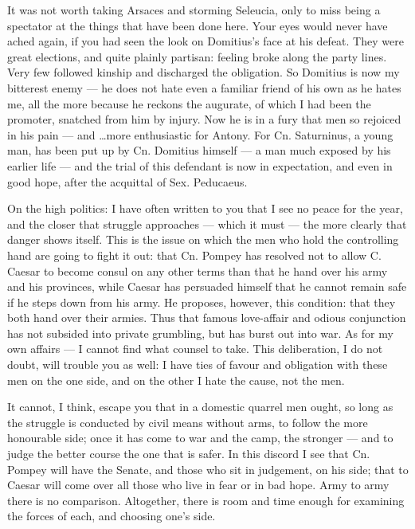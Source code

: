 

 It was not worth taking Arsaces and storming Seleucia, only to miss being a spectator at the things that have been done here. Your eyes would never have ached again, if you had seen the look on Domitius's face at his defeat. They were great elections, and quite plainly partisan: feeling broke along the party lines. Very few followed kinship and discharged the obligation. So Domitius is now my bitterest enemy --- he does not hate even a familiar friend of his own as he hates me, all the more because he reckons the augurate, of which I had been the promoter, snatched from him by injury. Now he is in a fury that men so rejoiced in his pain --- and \dots more enthusiastic for Antony. For Cn. Saturninus, a young man, has been put up by Cn. Domitius himself --- a man much exposed by his earlier life --- and the trial of this defendant is now in expectation, and even in good hope, after the acquittal of Sex. Peducaeus.

 On the high politics: I have often written to you that I see no peace for the year, and the closer that struggle approaches --- which it must --- the more clearly that danger shows itself. This is the issue on which the men who hold the controlling hand are going to fight it out: that Cn. Pompey has resolved not to allow C. Caesar to become consul on any other terms than that he hand over his army and his provinces, while Caesar has persuaded himself that he cannot remain safe if he steps down from his army. He proposes, however, this condition: that they both hand over their armies. Thus that famous love-affair and odious conjunction has not subsided into private grumbling, but has burst out into war. As for my own affairs --- I cannot find what counsel to take. This deliberation, I do not doubt, will trouble you as well: I have ties of favour and obligation with these men on the one side, and on the other I hate the cause, not the men.

 It cannot, I think, escape you that in a domestic quarrel men ought, so long as the struggle is conducted by civil means without arms, to follow the more honourable side; once it has come to war and the camp, the stronger --- and to judge the better course the one that is safer. In this discord I see that Cn. Pompey will have the Senate, and those who sit in judgement, on his side; that to Caesar will come over all those who live in fear or in bad hope. Army to army there is no comparison. Altogether, there is room and time enough for examining the forces of each, and choosing one's side.

